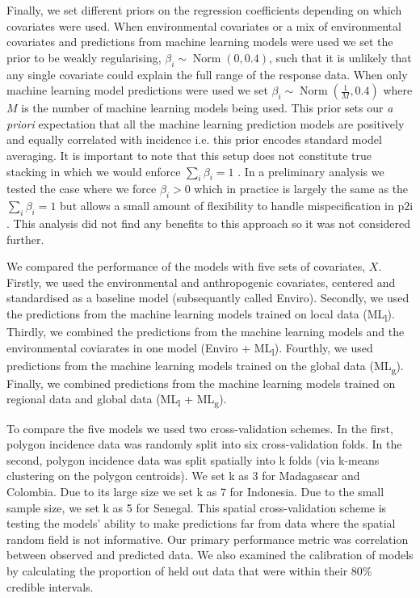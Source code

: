 \documentclass[11pt]{article}
\begin{document}
Finally, we set different priors on the regression coefficients depending on which covariates were used.
When environmental covariates or a mix of environmental covariates and predictions from machine learning models were used we set the prior to be weakly regularising, $\beta_i \sim \operatorname{ Norm}(0, 0.4)$, such that it is unlikely that any single covariate could explain the full range of the response data.
When only machine learning model predictions were used we set $\beta_i \sim \operatorname{ Norm}(\frac{1}{M}, 0.4)$ where $M$ is the number of machine learning models being used. 
This prior  sets our \emph{a priori} expectation that all the machine learning prediction models are positively and equally correlated with incidence i.e. this prior encodes standard model averaging.
It is important to note that this setup does not constitute true stacking in which we would enforce $\sum_i \beta_i = 1$ \citep{bhatt2017improved}.
In a preliminary analysis we tested the case where we force $\beta_i > 0$ which in practice is largely the same as the $\sum_i \beta_i = 1$  \citep{breiman1996stacked} but allows a small amount of flexibility to handle mispecification in $\mathrm{p2i}$.
This analysis did not find any benefits to this approach so it was not considered further.



We compared the performance of the models with five sets of covariates, $X$.
Firstly, we used the environmental and anthropogenic covariates, centered and standardised as a baseline model (subsequantly called Enviro).
Secondly, we used the predictions from the machine learning models trained on local data (ML\textsubscript{l}).
Thirdly, we combined the predictions from the machine learning models and the environmental coviarates in one model (Enviro + ML\textsubscript{l}).
Fourthly, we used predictions from the machine learning models trained on the global data (ML\textsubscript{g}).
Finally, we combined predictions from the machine learning models trained on regional data and global data (ML\textsubscript{l} + ML\textsubscript{g}).

To compare the five models we used two cross-validation schemes. 
In the first, polygon incidence data was randomly split into six cross-validation folds.
In the second, polygon incidence data was split spatially into k folds (via k-means clustering on the polygon centroids).
We set k as 3 for Madagascar and Colombia.
Due to its large size we set k as 7 for Indonesia.
Due to the small sample size, we set k as 5 for Senegal.
This spatial cross-validation scheme is testing the models' ability to make predictions far from data where the spatial random field is not informative.
Our primary performance metric was correlation between observed and predicted data.
We also examined the calibration of models by calculating the proportion of held out data that were within their 80\% credible intervals.
\end{document}
